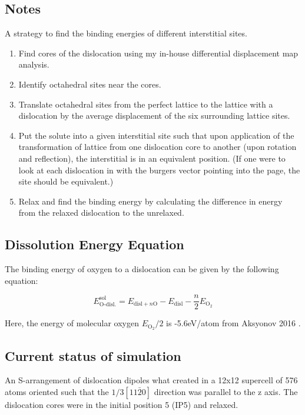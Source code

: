 \documentclass[11pt]{article}
\begin{document}
\subsection{Notes}
\label{sec:org3b5cca2}

A strategy to find the binding energies of different interstitial
sites. 

\begin{enumerate}
\item Find cores of the dislocation using my in-house differential
displacement map analysis.
\item Identify octahedral sites near the cores.
\item Translate octahedral sites from the perfect lattice to the
lattice with a dislocation by the average displacement of the six
surrounding lattice sites.
\item Put the solute into a given interstitial site such that upon
application of the transformation of lattice from one
dislocation core to another (upon rotation and reflection), the
interstitial is in an equivalent position. (If one were to look
at each dislocation in with the burgers vector pointing into the
page, the site should be equivalent.)
\item Relax and find the binding energy by calculating the difference
in energy from the relaxed dislocation to the unrelaxed.
\end{enumerate}


\subsection{Dissolution Energy Equation}
\label{sec:org7c0180d}

The binding energy of oxygen to a dislocation can be given by the
following equation:

\[ E^{\text{sol}}_{\text{O-disl.}} = E_{\text{disl} + n\text{O}} -
   E_{\text{disl}} - \frac{n}{2} E_{\text{O}_2}   \]

Here, the energy of molecular oxygen \(E_{\text{O}_2}/2\) is -5.6eV/atom
from Aksyonov 2016 \cite{Aksyonov2016}. 



\subsection{Current status of simulation}
\label{sec:orga76c0dd}

An S-arrangement of dislocation dipoles what created in a 12x12
supercell of 576 atoms oriented such that the \(1/3[11\bar{2}0]\)
direction was parallel to the z axis. The dislocation cores were in
the initial position 5 (IP5) and relaxed.
\end{document}
